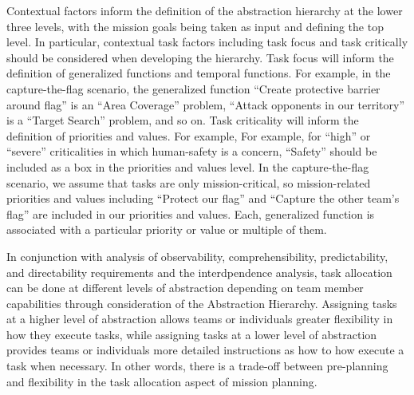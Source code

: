 \documentclass[letterpaper, 10 pt, conference]{ieeeconf}  %
\theoremstyle{definition}
\begin{document}
Contextual factors inform the definition of the abstraction hierarchy at the lower three levels, with the mission goals being taken as input and defining the top level. In particular, contextual task factors including task focus and task critically should be considered when developing the hierarchy. Task focus will inform the definition of generalized functions and temporal functions. For example, in the capture-the-flag scenario, the generalized function ``Create protective barrier around flag'' is an ``Area Coverage'' problem, ``Attack opponents in our territory'' is a ``Target Search'' problem, and so on. Task criticality will inform the definition of priorities and values. For example, For example, for ``high'' or ``severe'' criticalities in which human-safety is a concern, ``Safety'' should be included as a box in the priorities and values level. In the capture-the-flag scenario, we assume that tasks are only mission-critical, so mission-related priorities and values including ``Protect our flag'' and ``Capture the other team's flag'' are included in our priorities and values. Each, generalized function is associated with a particular priority or value or multiple of them.




In conjunction with analysis of observability, comprehensibility, predictability, and directability requirements and the interdpendence analysis, task allocation can be done at different levels of abstraction depending on team member capabilities through consideration of the Abstraction Hierarchy. Assigning tasks at a higher level of abstraction allows teams or individuals greater flexibility in how they execute tasks, while assigning tasks at a lower level of abstraction provides teams or individuals more detailed instructions as how to how execute a task when necessary. In other words, there is a trade-off between pre-planning and flexibility in the task allocation aspect of mission planning.
\end{document}
